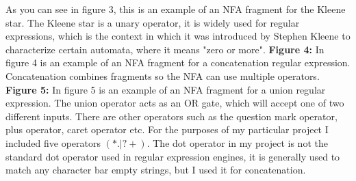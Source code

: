 \documentclass[12pt]{article}
\begin{document}
\begin{description}
As you can see in figure 3, this is an example of an NFA fragment for the Kleene star. The Kleene star is a unary operator, it is widely used for regular expressions, which is the context in which it was introduced by Stephen Kleene to characterize certain automata, where it means "zero or more".
\newline\newline
\textbf{Figure 4:}
\newline\newline
In figure 4 is an example of an NFA fragment for a concatenation regular expression. Concatenation combines fragments so the NFA can use multiple operators.
\newline\newline
\textbf{Figure 5:}
\newline\newline
In figure 5 is an example of an NFA fragment for a union regular expression. The union operator acts as an OR gate, which will accept one of two different inputs.
\newline\newline\newline
There are other operators such as the question mark operator, plus operator, caret operator etc. For the purposes of my particular project I included five operators $( * . | ? +)$. The dot operator in my project is not the standard dot operator used in regular expression engines, it is generally used to match any character bar empty strings, but I used it for concatenation.
\end{description}

\newpage
\end{document}
